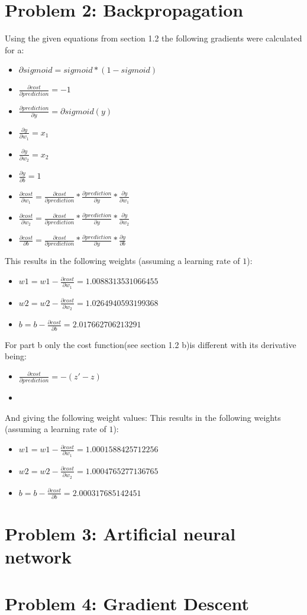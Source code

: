 \section{Problem 2: Backpropagation}
Using the given equations from section 1.2 the following gradients were calculated for a:
\begin{itemize}
\item  $\partial sigmoid = sigmoid*(1-sigmoid)$
\item  $\frac {\partial cost}{\partial prediction} = -1 $
\item  $\frac {\partial prediction}{\partial y} = \partial sigmoid(y)$ 
\item  $\frac {\partial y}{\partial w_1}=x_1$
\item  $\frac {\partial y}{\partial w_2}=x_2$
\item  $\frac {\partial y}{\partial b}=1$
\item  $\frac {\partial cost}{\partial w_1}=\frac {\partial cost}{\partial prediction}*\frac {\partial prediction}{\partial y}*\frac {\partial y}{\partial w_1}$
\item  $\frac {\partial cost}{\partial w_2}=\frac {\partial cost}{\partial prediction}*\frac {\partial prediction}{\partial y}*\frac {\partial y}{\partial w_2}$
\item  $\frac {\partial cost}{\partial b}=\frac {\partial cost}{\partial prediction}*\frac {\partial prediction}{\partial y}*\frac {\partial y}{\partial b}$
\end{itemize}
This results in the following weights (assuming a learning rate of $1$):
\begin{itemize}
\item $w1 = w1-\frac {\partial cost}{\partial w_1} = 1.0088313531066455$
\item $w2 = w2 - \frac {\partial cost}{\partial w_2}=1.0264940593199368$\\
\item $b = b - \frac {\partial cost}{\partial b}=2.017662706213291$
\end{itemize}
For part b only the cost function(see section 1.2 b)is different with its derivative being:
\begin{itemize}
\item $\frac {\partial cost}{\partial prediction} = -(z'-z)$
\item 
\end{itemize}
And giving the following weight values:
This results in the following weights (assuming a learning rate of $1$):
\begin{itemize}
\item $w1 = w1-\frac {\partial cost}{\partial w_1} = 1.0001588425712256$
\item $w2 = w2 - \frac {\partial cost}{\partial w_2}=1.0004765277136765$\\
\item $b = b - \frac {\partial cost}{\partial b}=2.000317685142451$
\end{itemize}
\section{Problem 3: Artificial neural network}

\section{Problem 4: Gradient Descent}
